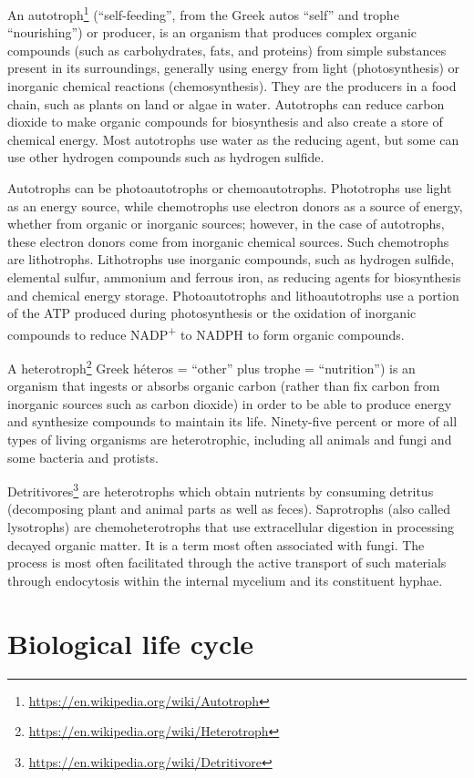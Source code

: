 \documentclass[]{book}
\let\rmarkdownfootnote\footnote%
\def\footnote{\protect\rmarkdownfootnote}
\renewcommand{\href}[2]{#2\footnote{\url{#1}}}
\begin{document}
An \href{https://en.wikipedia.org/wiki/Autotroph}{autotroph} (``self-feeding'', from the Greek autos ``self'' and trophe ``nourishing'') or producer, is an organism that produces complex organic compounds (such as carbohydrates, fats, and proteins) from simple substances present in its surroundings, generally using energy from light (photosynthesis) or inorganic chemical reactions (chemosynthesis). They are the producers in a food chain, such as plants on land or algae in water. Autotrophs can reduce carbon dioxide to make organic compounds for biosynthesis and also create a store of chemical energy. Most autotrophs use water as the reducing agent, but some can use other hydrogen compounds such as hydrogen sulfide.

Autotrophs can be photoautotrophs or chemoautotrophs. Phototrophs use light as an energy source, while chemotrophs use electron donors as a source of energy, whether from organic or inorganic sources; however, in the case of autotrophs, these electron donors come from inorganic chemical sources. Such chemotrophs are lithotrophs. Lithotrophs use inorganic compounds, such as hydrogen sulfide, elemental sulfur, ammonium and ferrous iron, as reducing agents for biosynthesis and chemical energy storage. Photoautotrophs and lithoautotrophs use a portion of the ATP produced during photosynthesis or the oxidation of inorganic compounds to reduce NADP\textsuperscript{+} to NADPH to form organic compounds.

A \href{https://en.wikipedia.org/wiki/Heterotroph}{heterotroph} Greek héteros = ``other'' plus trophe = ``nutrition'') is an organism that ingests or absorbs organic carbon (rather than fix carbon from inorganic sources such as carbon dioxide) in order to be able to produce energy and synthesize compounds to maintain its life. Ninety-five percent or more of all types of living organisms are heterotrophic, including all animals and fungi and some bacteria and protists.

\href{https://en.wikipedia.org/wiki/Detritivore}{Detritivores} are heterotrophs which obtain nutrients by consuming detritus (decomposing plant and animal parts as well as feces). Saprotrophs (also called lysotrophs) are chemoheterotrophs that use extracellular digestion in processing decayed organic matter. It is a term most often associated with fungi. The process is most often facilitated through the active transport of such materials through endocytosis within the internal mycelium and its constituent hyphae. 

\hypertarget{biological-life-cycle}{%
\section{Biological life cycle}\label{biological-life-cycle}}
\end{document}
